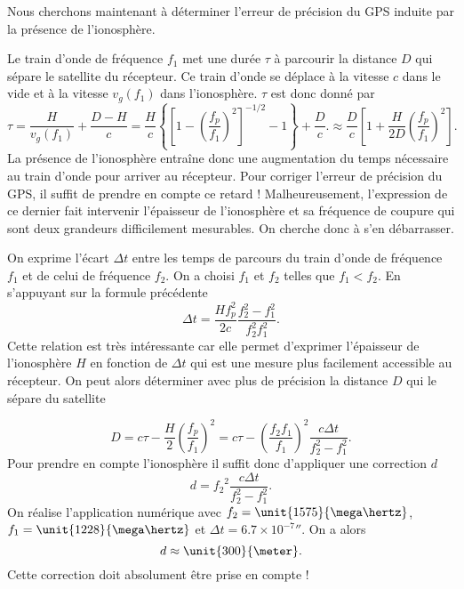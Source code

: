 Nous cherchons maintenant à déterminer l'erreur de précision du GPS induite
par la présence de l'ionosphère.

Le train d'onde de fréquence $f_1$ met une durée $\tau$ à parcourir la distance
$D$ qui sépare le satellite du récepteur.
 Ce train d'onde se déplace à la vitesse $c$ dans le vide et à la vitesse 
 $v_g(f_1)$ dans l'ionosphère. $\tau$ est donc donné par 
\begin{equation*}
	\tau = \dfrac{H}{v_g(f_1)} + \dfrac{D - H}{c} = \dfrac{H}{c}
	\left\{\left[1 - \left(\dfrac{f_p}{f_1}\right)^2\right]^{-1/2} - 1 \right\}
	+ \dfrac{D}{c}.
	\approx \boxed{\dfrac{D}{c} \left[1 + \dfrac{H}{2D}\left(\dfrac{f_p}{f_1}\right)^2
	\right]}.
\end{equation*}
La présence de l'ionosphère entraîne donc une augmentation du temps nécessaire
au train d'onde pour arriver au récepteur. Pour corriger l'erreur de précision
du GPS, il suffit de prendre en compte ce retard !
Malheureusement, l'expression de ce dernier fait intervenir l'épaisseur de 
l'ionosphère et sa fréquence de coupure qui sont deux grandeurs difficilement 
mesurables. On cherche donc à s'en débarrasser.

On exprime l'écart $\Delta t$ entre les temps de parcours
du train d'onde de fréquence $f_1$ et de celui de fréquence $f_2$. On a choisi
$f_1$ et $f_2$ telles que $f_1 < f_2$. En s'appuyant sur la formule précédente 
\begin{equation*}
	\boxed{\Delta t = \dfrac{H f_p^2}{2c} \dfrac{f_2^2 - f_1^2}{f_2^2f_1^2}.}
\end{equation*}
Cette relation est très intéressante car elle permet d'exprimer l'épaisseur 
de l'ionosphère $H$ en fonction de $\Delta t$ qui est une mesure plus facilement 
accessible au récepteur. On peut alors déterminer avec plus de précision la
distance $D$ qui le sépare du satellite

\begin{equation*}
	D = c \tau - \dfrac{H}{2}\left(\dfrac{f_p}{f_1}\right)^2 = 
	c \tau - \left(\dfrac{f_2 f_1}{f_1}\right)^2 \dfrac{c \Delta t}{ 
	f_2^2 - f_1^2}.
\end{equation*}
Pour prendre en compte l'ionosphère il suffit donc d'appliquer une correction $d$
\begin{equation*}
	\boxed{d = {f_2}^2 \dfrac{c \Delta t}{ 
	f_2^2 - f_1^2}.
 }
\end{equation*}
On réalise l'application numérique avec $f_2 = \unit{1575}{\mega \hertz}$, 
$f_1 = \unit{1228}{\mega \hertz}$
et $\Delta t = \unit{6.7 \times 10^{-7}}{\second}$. On a alors
\begin{equation*}
	d \approx \unit{300}{\meter}.
\end{equation*}
Cette correction doit absolument être prise en compte !

